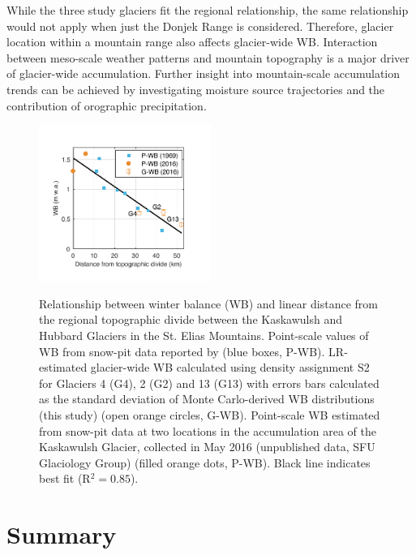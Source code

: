 \documentclass{sfuthesis}
\begin{document}
While the three study glaciers fit the regional relationship, the same relationship would not apply when just the Donjek Range is considered. Therefore, glacier location within a mountain range also affects glacier-wide WB. Interaction between meso-scale weather patterns and mountain topography is a major driver of glacier-wide accumulation. Further insight into mountain-scale accumulation trends can be achieved by investigating moisture source trajectories and  the contribution of orographic precipitation. 

\begin{figure}
	\centering
	\includegraphics[width =0.5\textwidth]{AccumGrad.pdf}\\
	\caption{Relationship between winter balance (WB) and linear distance from the regional topographic divide between the Kaskawulsh and Hubbard Glaciers in the St. Elias Mountains. Point-scale values of WB from snow-pit data reported by \cite{Taylor1969} (blue boxes, P-WB). LR-estimated glacier-wide WB calculated using density assignment S2 for Glaciers 4 (G4), 2 (G2) and 13 (G13) with errors bars calculated as the standard deviation of Monte Carlo-derived WB distributions (this study) (open orange circles, G-WB). Point-scale WB estimated from snow-pit data at two locations in the accumulation area of the Kaskawulsh Glacier, collected in May 2016 (unpublished data, SFU Glaciology Group) (filled orange dots, P-WB). Black line indicates best fit (R$^2=0.85$).}
	\label{fig:AccumGrad}
\end{figure}



 \section{Summary}
 
\end{document}
